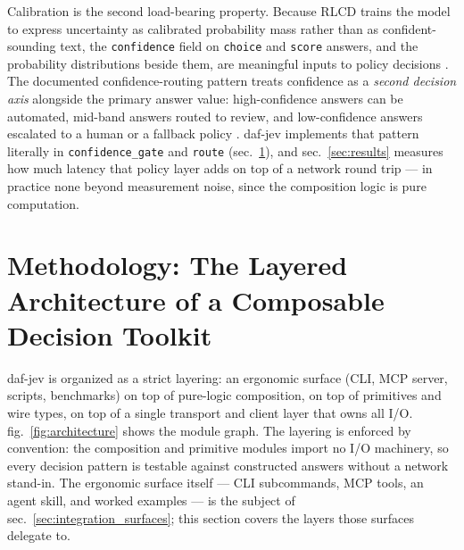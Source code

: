 \documentclass[
  english,
]{article}
\newcounter{none} %
\begin{document}
Calibration is the second load-bearing property. Because RLCD trains the
model to express uncertainty as calibrated probability mass rather than
as confident-sounding text, the \texttt{confidence} field on
\texttt{choice} and \texttt{score} answers, and the probability
distributions beside them, are meaningful inputs to policy decisions
\citep{typesafe2026systemoneconcept, typesafe2026confidence}. The
documented confidence-routing pattern treats confidence as a
\emph{second decision axis} alongside the primary answer value:
high-confidence answers can be automated, mid-band answers routed to
review, and low-confidence answers escalated to a human or a fallback
policy \citep{typesafe2026confidence, typesafe2026patterns}. daf-jev
implements that pattern literally in \texttt{confidence\_gate} and
\texttt{route} (sec.~\ref{sec:methodology}), and sec.~\ref{sec:results}
measures how much latency that policy layer adds on top of a network
round trip --- in practice none beyond measurement noise, since the
composition logic is pure computation.

\newpage

\section{Methodology: The Layered Architecture of a Composable Decision
Toolkit}\label{sec:methodology}

daf-jev is organized as a strict layering: an ergonomic surface (CLI,
MCP server, scripts, benchmarks) on top of pure-logic composition, on
top of primitives and wire types, on top of a single transport and
client layer that owns all I/O. fig.~\ref{fig:architecture} shows the
module graph. The layering is enforced by convention: the composition
and primitive modules import no I/O machinery, so every decision pattern
is testable against constructed answers without a network stand-in. The
ergonomic surface itself --- CLI subcommands, MCP tools, an agent skill,
and worked examples --- is the subject of
sec.~\ref{sec:integration_surfaces}; this section covers the layers
those surfaces delegate to.
\end{document}
